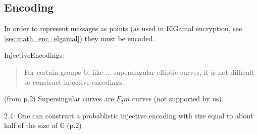 \subsection{Encoding}
\label{sec:math_encoding}

In order to represent messages as points (as used in ElGamal encryption, see \ref{sec:math_enc_elgamal}) they must be encoded.

InjectiveEncodings:

\begin{quote}
    For certain groups \(\mathbb{G}\), like ... supersingular elliptic curves, it is not difficult to construct injective
	encodings...
\end{quote}

(from p.2) Supersingular curves are \(F_2m\) curves (not supported by us).

2.4: One can construct a probablistic injective encoding with size equal to about half of the size of \(\mathbb{G}\) (p.2)